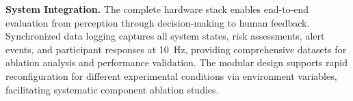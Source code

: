 \textbf{System Integration.} The complete hardware stack enables end-to-end evaluation 
from perception through decision-making to human feedback. Synchronized data logging 
captures all system states, risk assessments, alert events, and participant responses 
at 10~Hz, providing comprehensive datasets for ablation analysis and performance 
validation. The modular design supports rapid reconfiguration for different 
experimental conditions via environment variables, facilitating systematic 
component ablation studies. 